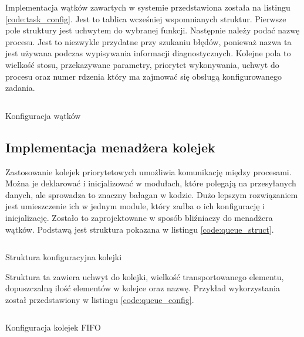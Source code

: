             Implementacja wątków zawartych w systemie przedstawiona została na listingu \ref{code:task_config}. Jest to tablica wcześniej wspomnianych struktur. Pierwsze pole struktury jest uchwytem do wybranej funkcji. Następnie należy podać nazwę procesu. Jest to niezwykle przydatne przy szukaniu błędów, ponieważ nazwa ta jest używana podczas wypisywania informacji diagnostycznych. Kolejne pola to wielkość stosu, przekazywane parametry, priorytet wykonywania, uchwyt do procesu oraz numer rdzenia który ma zajmować się obsługą konfigurowanego zadania.
            
            \begin{kod}
              \inputminted[firstline=19, lastline=60]{cpp}{esp/listings/task_mngm.cpp}
              \caption{Konfiguracja wątków}
              \label{code:task_config}
              \vspace{2em}
            \end{kod}
            
            \subsection{Implementacja menadżera kolejek}
            Zastosowanie kolejek priorytetowych umożliwia komunikację między procesami. Można je deklarować i inicjalizować w modułach, które polegają na przesyłanych danych, ale sprowadza to znaczny bałagan w kodzie. Dużo lepszym rozwiązaniem jest umieszczenie ich w jednym module, który zadba o ich konfigurację i inicjalizację. Zostało to zaprojektowane w sposób bliźniaczy do menadżera wątków. Podstawą jest struktura pokazana w listingu \ref{code:queue_struct}.
 
            \begin{kod}
              \inputminted[firstline=40, lastline=47]{cpp}{esp/listings/task_mngm.hpp}
              \caption{Struktura konfiguracyjna kolejki}
              \label{code:queue_struct}
              \vspace{2em}
            \end{kod}
            
            Struktura ta zawiera uchwyt do kolejki, wielkość transportowanego elementu, dopuszczalną ilość elementów w kolejce oraz nazwę. Przykład wykorzystania został przedstawiony w listingu \ref{code:queue_config}. 
            
            \begin{kod}
              \inputminted[firstline=63, lastline=99]{cpp}{esp/listings/task_mngm.cpp}
              \caption{Konfiguracja kolejek FIFO}
              \label{code:queue_config}
              \vspace{1em}
            \end{kod}
            
